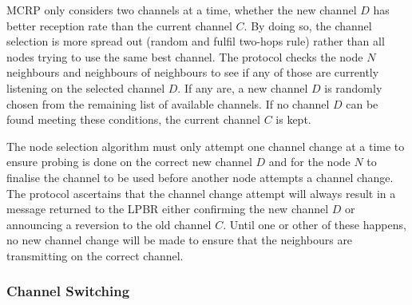 MCRP only considers two channels at a time, whether the new channel $D$ has better reception rate than the current channel $C$. By doing so, the channel selection is more spread out (random and fulfil two-hops rule) rather than all nodes trying to use the same best channel.
The protocol checks the node $N$ neighbours and neighbours of neighbours to see if any of those are currently listening on the selected channel $D$. If any are, a new channel $D$ is randomly chosen from the remaining list of available channels. 
If no channel $D$ can be found meeting these conditions, the current channel $C$ is kept. 

The node selection algorithm must only attempt one channel change at a time to ensure probing is done on the correct new channel $D$ and for the node $N$ to finalise the channel to be used before another node attempts a channel change.
The protocol ascertains that the channel change attempt will always result in a message returned to the LPBR either confirming the new channel $D$ or announcing a reversion to the old channel $C$. Until one or other of these happens, no new channel change will be made to ensure that the neighbours are transmitting on the correct channel.

\subsubsection{Channel Switching}

